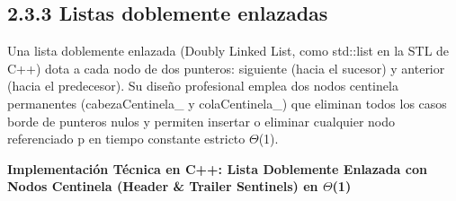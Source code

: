 \documentclass[11pt,letterpaper]{article}
\begin{document}
\subsection*{2.3.3 Listas doblemente enlazadas}
Una lista doblemente enlazada (Doubly Linked List, como std::list en la STL de C++) dota a cada nodo de dos punteros: siguiente (hacia el sucesor) y anterior (hacia el predecesor). Su diseño profesional emplea dos nodos centinela permanentes (cabezaCentinela\_ y colaCentinela\_) que eliminan todos los casos borde de punteros nulos y permiten insertar o eliminar cualquier nodo referenciado p en tiempo constante estricto $\Theta$(1).\par
\vspace{4pt}\noindent\textbf{\color{ipnblue}Implementación Técnica en C++: Lista Doblemente Enlazada con Nodos Centinela (Header \& Trailer Sentinels) en $\Theta$(1)}\par\vspace{-2pt}
\end{document}

